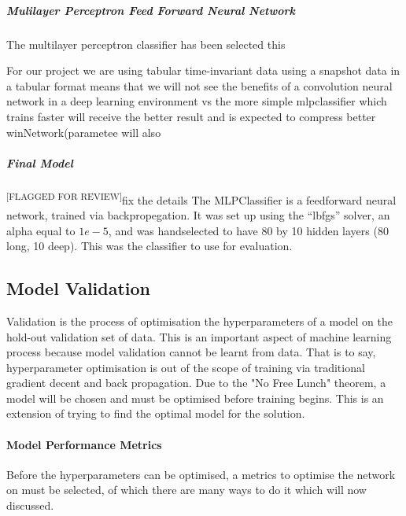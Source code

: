 \documentclass{UoNMCHA}
\newcommand{\flagforreview}{\textsuperscript{\color{red} [FLAGGED FOR REVIEW]}}
\newcommand{\inlineQuote}[1]{``#1''}
\numberwithin{equation}{section}
\begin{document}
\subparagraph{Mulilayer Perceptron Feed Forward Neural Network}
The multilayer perceptron classifier has been selected this

For our project we are using tabular time-invariant data using a snapshot data in a tabular format means that we will not see the benefits of a convolution neural network in a deep learning environment vs the more simple mlpclassifier which trains faster will receive the better result and is expected to compress better winNetwork(parametee will also

\subparagraph{Final Model} \flagforreview fix the details
The MLPClassifier is a feedforward neural network, trained via backpropegation. It was set up using the \inlineQuote{lbfgs} solver, an alpha equal to $1e-5$, and was handselected to have 80 by 10 hidden layers (80 long, 10 deep). This was the classifier to use for evaluation.



\subsection{Model Validation}
Validation is the process of optimisation the hyperparameters of a model on the hold-out validation set of data. This is an important aspect of machine learning process because model validation cannot be learnt from data. That is to say, hyperparameter optimisation is out of the scope of training via traditional gradient decent and back propagation. Due to the "No Free Lunch" theorem, a model will be chosen and must be optimised before training begins. This is an extension of trying to find the optimal model for the solution. 

\paragraph{Model Performance Metrics}
Before the hyperparameters can be optimised, a metrics to optimise the network on must be selected, of which there are many ways to do it which will now discussed. \\
\end{document}
